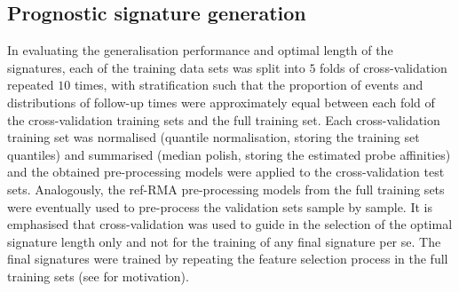 \documentclass[letterpaper,12pt]{article}
\begin{document}
\subsection{Prognostic signature generation}
In evaluating the generalisation performance and optimal length of the signatures, each of the training data sets was split into $5$ folds of cross-validation repeated $10$ times, with stratification such that the proportion of events and distributions of follow-up times were approximately equal between each fold of the cross-validation training sets and the full training set. Each cross-validation training set was normalised (quantile normalisation, storing the training set quantiles) and summarised (median polish, storing the estimated probe affinities) and the obtained pre-processing models were applied to the cross-validation test sets. Analogously, the ref-RMA pre-processing models from the full training sets were eventually used to pre-process the validation sets sample by sample. It is emphasised that cross-validation was used to guide in the selection of the optimal signature length only and not for the training of any final signature per se. The final signatures were trained by repeating the feature selection process in the full training sets (see \citet{Simon:12} for motivation).
\end{document}

